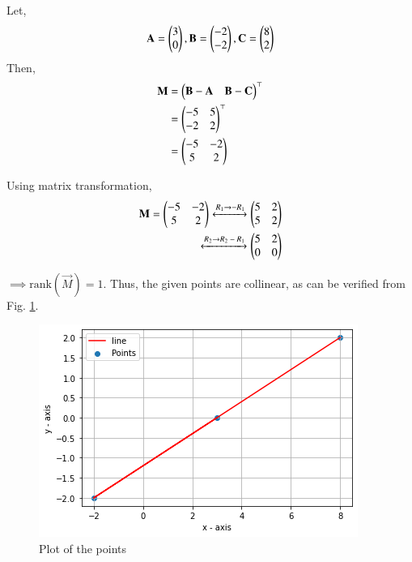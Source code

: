 
Let,
\begin{align}
    \mathbf{A} = \begin{pmatrix}3 \\ 0\end{pmatrix},
    \mathbf{B} = \begin{pmatrix}-2 \\ -2\end{pmatrix}, 
    \mathbf{C} = \begin{pmatrix}8 \\ 2\end{pmatrix}
\end{align}
Then, 
%
%
\begin{align}
\mathbf{M} &= \begin{pmatrix}\mathbf{B}-\mathbf{A}  &  \mathbf{B}-\mathbf{C}\end{pmatrix}^\top \\
        &= \begin{pmatrix}-5 & 5 \\ -2 & 2\end{pmatrix}^\top\\
        &= \begin{pmatrix}-5 & -2 \\ 5 & 2\end{pmatrix}
\end{align}

Using matrix transformation,
\begin{align}
\mathbf{M} = \begin{pmatrix}-5 & -2 \\ 5 & 2\end{pmatrix} \xleftrightarrow{\text{$R_1$}\rightarrow{\text{$-R_1$}}} 
\begin{pmatrix} 5 & 2 \\ 5 & 2\end{pmatrix} \\
\xleftrightarrow{\text{$R_2$}\rightarrow{\text{$R_2 - R_1$}}}
\begin{pmatrix}5 & 2 \\ 0 & 0\end{pmatrix}
\end{align}

$\implies \text{rank}(\vec{M}) = 1$.  Thus, the given points are collinear, as can be verified from Fig. \ref{aug/2/8/Plot}.
 
\begin{figure}[!ht]
\centering
\includegraphics[width=\columnwidth]{solutions/aug/2/8/Figures/Grid.png}
\caption{Plot of the points}
\label{aug/2/8/Plot}
\end{figure}




